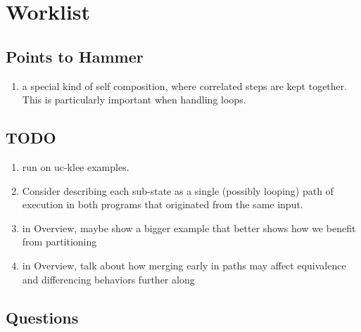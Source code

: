 \section{Worklist}

\subsection{Points to Hammer}

\begin{enumerate}
\item a special kind of self composition, where correlated steps are kept together. This is particularly important when handling loops.
\end{enumerate}

\subsection{TODO}
\begin{enumerate}
\item run on uc-klee examples.
\item Consider describing each sub-state as a single (possibly looping) path of execution in both programs that originated from the same input.
\item in Overview, maybe show a bigger example that better shows how we benefit from partitioning
\item in Overview, talk about how merging early in paths may affect equivalence and differencing behaviors further along
\end{enumerate}


\subsection{Questions}

